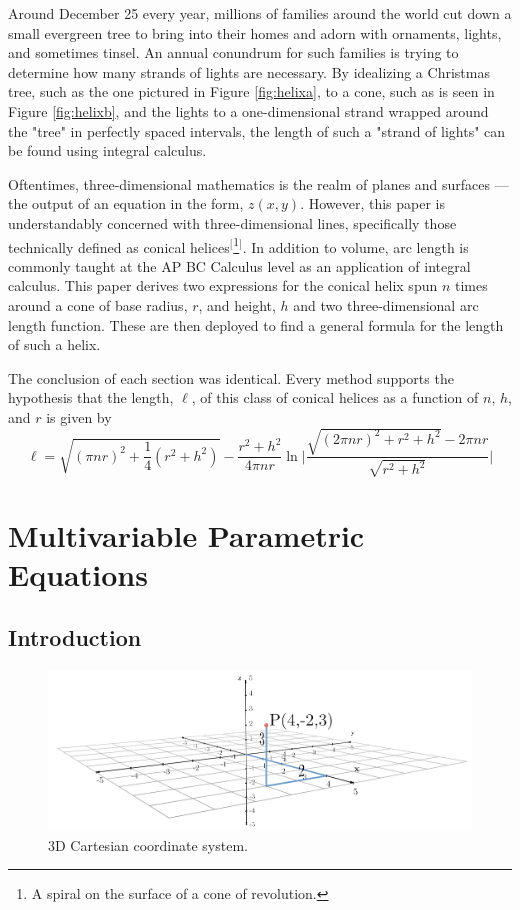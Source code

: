 \documentclass{article}
\begin{document}
Around December 25 every year, millions of families around the world cut down a small evergreen tree to bring into their homes and adorn with ornaments, lights, and sometimes tinsel. An annual conundrum for such families is trying to determine how many strands of lights are necessary. By idealizing a Christmas tree, such as the one pictured in Figure \ref{fig:helixa}, to a cone, such as is seen in Figure \ref{fig:helixb}, and the lights to a one-dimensional strand wrapped around the "tree" in perfectly spaced intervals, the length of such a "strand of lights" can be found using integral calculus.\par
Oftentimes, three-dimensional mathematics is the realm of planes and surfaces --- the output of an equation in the form, $z(x,y)$. However, this paper is understandably concerned with three-dimensional lines, specifically those technically defined as conical helices$^[$\footnote{A spiral on the surface of a cone of revolution.}$^]$. In addition to volume, arc length is commonly taught at the AP BC Calculus level as an application of integral calculus. This paper derives two expressions for the conical helix spun $n$ times around a cone of base radius, $r$, and height, $h$ and two three-dimensional arc length function. These are then deployed to find a general formula for the length of such a helix.\par
The conclusion of each section was identical. Every method supports the hypothesis that the length, $\ell$, of this class of conical helices as a function of $n$, $h$, and $r$ is given by
\begin{equation*}
    \ell = \sqrt{(\pi nr)^2+\frac{1}{4}\left(r^2+h^2\right)}-\frac{r^2+h^2}{4\pi nr}\ln\Bigg|\frac{\sqrt{(2\pi nr)^2+r^2+h^2}-2\pi nr}{\sqrt{r^2+h^2}}\Bigg|
\end{equation*}
\newpage



\setcounter{secnumdepth}{3}
\section{Multivariable Parametric Equations}
\subsection{Introduction}

\begin{figure}[h!]
    \centering
    \includegraphics[width=0.711\linewidth]{Blender/cartesian.png}
    \caption{3D Cartesian coordinate system.}
    \label{fig:cart}
\end{figure}
\end{document}

